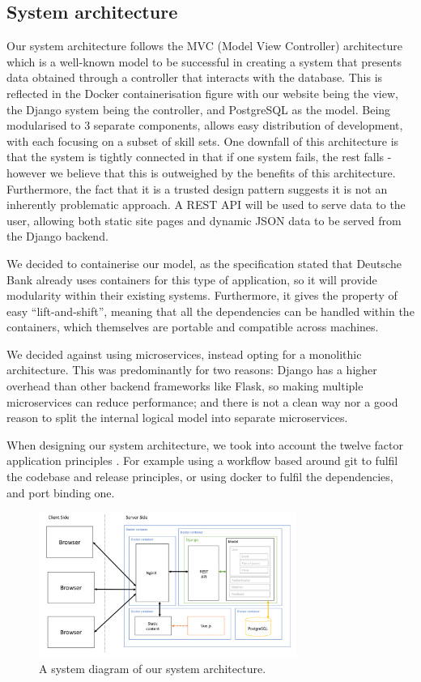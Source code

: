 \documentclass[10pt]{article}
\begin{document}
\subsection{System architecture}
Our system architecture follows the MVC (Model View Controller) architecture
which is a well-known model to be successful in creating a system that presents
data obtained through a controller that interacts with the database. This is
reflected in the Docker containerisation figure with our website being the view,
the Django system being the controller, and PostgreSQL as the model. Being
modularised to 3 separate components, allows easy distribution of development,
with each focusing on a subset of skill sets. One downfall of this architecture
is that the system is tightly connected in that if one system fails, the rest
falls - however we believe that this is outweighed by the benefits of this
architecture. Furthermore, the fact that it is a trusted design pattern suggests
it is not an inherently problematic approach. A REST API will be used to serve
data to the user, allowing both static site pages and dynamic JSON data to be
served from the Django backend.

We decided to containerise our model, as the specification stated that Deutsche
Bank already uses containers for this type of application, so it will provide
modularity within their existing systems. Furthermore, it gives the property of
easy ``lift-and-shift'', meaning that all the dependencies can be handled within
the containers, which themselves are portable and compatible across machines.

We decided against using microservices, instead opting for a monolithic
architecture. This was predominantly for two reasons: Django has a higher
overhead than other backend frameworks like Flask, so making multiple
microservices can reduce performance; and there is not a clean way nor a good
reason to split the internal logical model into separate microservices.

When designing our system architecture, we took into account the twelve factor
application principles \cite{twelveFactor}. For example using a workflow based
around git to fulfil the codebase and release principles, or using docker to
fulfil the dependencies, and port binding one.

\begin{figure}[H]
    \centering
    \includegraphics[width=0.75\textwidth]{architecture}
    \caption{A system diagram of our system architecture.}
    \label{fig:system_architecture_diagram}
\end{figure}
\end{document}
